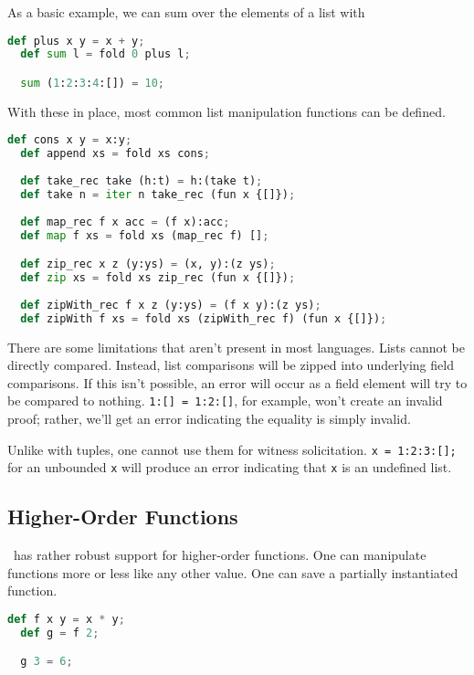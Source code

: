 As a basic example, we can sum over the elements of a list with

\begin{lstlisting}[language=Python]
  def plus x y = x + y;
  def sum l = fold 0 plus l;

  sum (1:2:3:4:[]) = 10;
\end{lstlisting}

With these in place, most common list manipulation functions can be defined.

\begin{lstlisting}[language=Python]
  def cons x y = x:y;
  def append xs = fold xs cons;
  
  def take_rec take (h:t) = h:(take t);
  def take n = iter n take_rec (fun x {[]});
  
  def map_rec f x acc = (f x):acc;
  def map f xs = fold xs (map_rec f) [];

  def zip_rec x z (y:ys) = (x, y):(z ys);
  def zip xs = fold xs zip_rec (fun x {[]});
  
  def zipWith_rec f x z (y:ys) = (f x y):(z ys);
  def zipWith f xs = fold xs (zipWith_rec f) (fun x {[]});
\end{lstlisting}

There are some limitations that aren't present in most languages. Lists cannot be directly compared. Instead, list comparisons will be zipped into underlying field comparisons. If this isn't possible, an error will occur as a field element will try to be compared to nothing. \lstinline{1:[] = 1:2:[]}, for example, won't create an invalid proof; rather, we'll get an error indicating the equality is simply invalid.

Unlike with tuples, one cannot use them for witness solicitation. \lstinline{x = 1:2:3:[];} for an unbounded \lstinline{x} will produce an error indicating that \lstinline{x} is an undefined list.


\subsection{Higher-Order Functions} \label{HOF}

\vampir\ has rather robust support for higher-order functions. One can manipulate functions more or less like any other value. One can save a partially instantiated function.

\begin{lstlisting}[language=Python]
  def f x y = x * y;
  def g = f 2;

  g 3 = 6;
\end{lstlisting}

